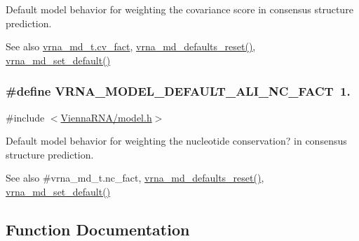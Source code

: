 Default model behavior for weighting the covariance score in consensus structure prediction. 

\begin{DoxySeeAlso}{See also}
\hyperlink{group__model__details_a62ebefb9d0643e5c4c8a2ec84a105ce6}{vrna\+\_\+md\+\_\+t.\+cv\+\_\+fact}, \hyperlink{group__model__details_ga70834424cf804d149937de89f80ceb45}{vrna\+\_\+md\+\_\+defaults\+\_\+reset()}, \hyperlink{group__model__details_ga8ac6ff84936282436f822644bf841f66}{vrna\+\_\+md\+\_\+set\+\_\+default()} 
\end{DoxySeeAlso}
\hypertarget{group__model__details_ga8f774daaafec28160c1ca5d09f2cbdba}{}
\subsubsection[{V\+R\+N\+A\+\_\+\+M\+O\+D\+E\+L\+\_\+\+D\+E\+F\+A\+U\+L\+T\+\_\+\+A\+L\+I\+\_\+\+N\+C\+\_\+\+F\+A\+C\+T}]{\setlength{\rightskip}{0pt plus 5cm}\#define V\+R\+N\+A\+\_\+\+M\+O\+D\+E\+L\+\_\+\+D\+E\+F\+A\+U\+L\+T\+\_\+\+A\+L\+I\+\_\+\+N\+C\+\_\+\+F\+A\+C\+T~1.}\label{group__model__details_ga8f774daaafec28160c1ca5d09f2cbdba}


{\ttfamily \#include $<$\hyperlink{model_8h}{Vienna\+R\+N\+A/model.\+h}$>$}



Default model behavior for weighting the nucleotide conservation? in consensus structure prediction. 

\begin{DoxySeeAlso}{See also}
\#vrna\+\_\+md\+\_\+t.\+nc\+\_\+fact, \hyperlink{group__model__details_ga70834424cf804d149937de89f80ceb45}{vrna\+\_\+md\+\_\+defaults\+\_\+reset()}, \hyperlink{group__model__details_ga8ac6ff84936282436f822644bf841f66}{vrna\+\_\+md\+\_\+set\+\_\+default()} 
\end{DoxySeeAlso}


\subsection{Function Documentation}
\hypertarget{group__model__details_ga8ac6ff84936282436f822644bf841f66}{}
